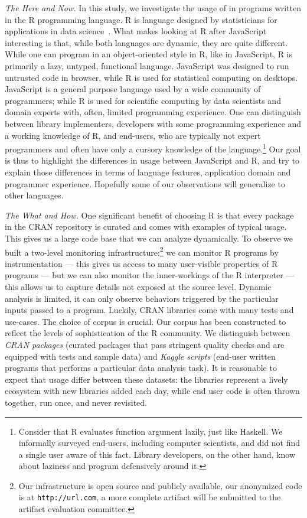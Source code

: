 \documentclass[screen,acmsmall]{acmart}
\begin{document}
\vspace{2mm}\noindent\emph{The Here and Now.} In this study, we investigate the
usage of \eval in programs written in the R programming language. R is language
designed by statisticians for applications in data science~\cite{r,R96}. What
makes looking at R after JavaScript interesting is that, while both languages
are dynamic, they are quite different. While one can program in an
object-oriented style in R, like in JavaScript, R is primarily a lazy, untyped,
functional language. JavaScript was designed to run untrusted code in browser,
while R is used for statistical computing on desktops. JavaScript is a general
purpose language used by a wide community of programmers; while R is used for
scientific computing by data scientists and domain experts with, often, limited
programming experience. One can distinguish between library implementers,
developers with some programming experience and a working knowledge of R, and
end-users, who are typically not expert programmers and often have only a
cursory knowledge of the language.\footnote{Consider that R evaluates function
argument lazily, just like Haskell. We informally surveyed end-users, including
computer scientists, and did not find a single user aware of this fact. Library
developers, on the other hand, know about laziness and program defensively
around it.} Our goal is thus to highlight the differences in usage between
JavaScript and R, and try to explain those differences in terms of language
features, application domain and programmer experience. Hopefully some of our
observations will generalize to other languages.

\vspace{2mm}\noindent\emph{The What and How.} One significant benefit of
choosing R is that every package in the CRAN repository is curated and comes
with examples of typical usage. This gives us a large code base that we can
analyze dynamically. To observe \eval we built a two-level monitoring
infrastructure:\footnote{Our infrastructure is open source and publicly
available, our anonymized code is at {\tt http://url.com}, a more complete
artifact will be submitted to the artifact evaluation committee. } we can
monitor R programs by instrumentation --- this gives us access to many
user-visible properties of R programs --- but we can also monitor the
inner-workings of the R interpreter --- this allows us to capture details not
exposed at the source level. Dynamic analysis is limited, it can only observe
behaviors triggered by the particular inputs passed to a program. Luckily, CRAN
libraries come with many tests and use-cases. The choice of corpus is crucial.
Our corpus has been constructed to reflect the levels of sophistication of the R
community. We distinguish between \emph{CRAN packages} (\CranPackages curated
packages that pass stringent quality checks and are equipped with tests and
sample data) and \emph{Kaggle scripts} (\KaggleUnique end-user written programs
that performs a particular data analysis task). It is reasonable to expect that
\eval usage differ between these datasets: the libraries represent a lively
ecosystem with new libraries added each day, while end user code is often thrown
together, run once, and never revisited.
\end{document}
